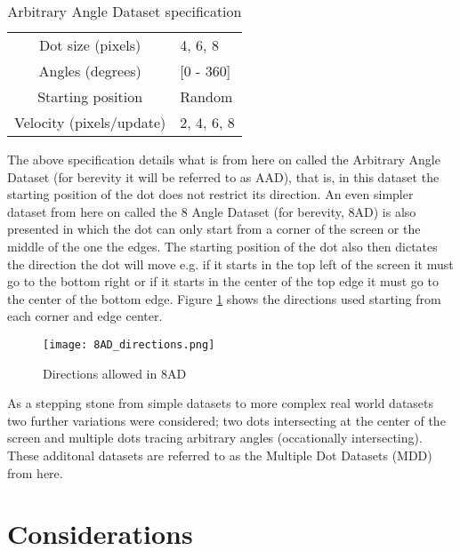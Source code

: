 \begin{table}[h]
\centering
\begin{tabular}{ | c | l | }
    \hline
    Dot size (pixels) & 4, 6, 8 \\
    Angles (degrees) & [0 - 360] \\
    Starting position & Random \\
    Velocity (pixels/update) & 2, 4, 6, 8 \\
    \hline
\end{tabular}
\caption{Arbitrary Angle Dataset specification}
\label{tb:datasetspecs}
\end{table}

The above specification details what is from here on called the Arbitrary Angle Dataset (for berevity it will be referred to as AAD), that is, in this dataset the starting position of the dot does not restrict its direction.
An even simpler dataset from here on called the 8 Angle Dataset (for berevity, 8AD) is also presented in which the dot can only start from a corner of the screen or the middle of the one the edges.
The starting position of the dot also then dictates the direction the dot will move e.g. if it starts in the top left of the screen it must go to the bottom right or if it starts in the center of the top edge it must go to the center of the bottom edge.
Figure \ref{fig:8ADDirections} shows the directions used starting from each corner and edge center.

\begin{figure}
    \centering
    \texttt{[image: 8AD\_directions.png]}
    \caption{Directions allowed in 8AD}
    \label{fig:8ADDirections}
\end{figure}

As a stepping stone from simple datasets to more complex real world datasets two further variations were considered; two dots intersecting at the center of the screen and multiple dots tracing arbitrary angles (occationally intersecting).
These additonal datasets are referred to as the Multiple Dot Datasets (MDD) from here. 





\section{Considerations}
